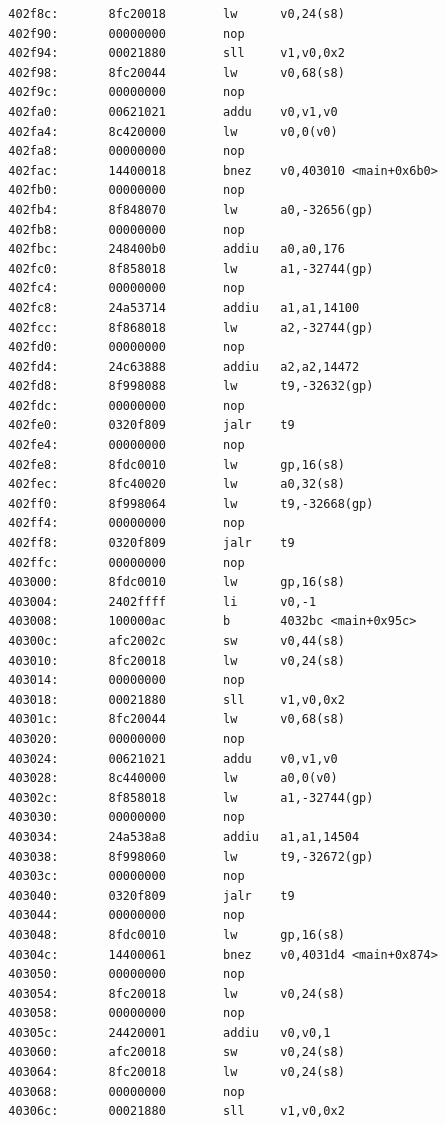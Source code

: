 \documentclass[11pt]{article}
\begin{document}
\begin{verbatim}
  402f8c:       8fc20018        lw      v0,24(s8)
  402f90:       00000000        nop
  402f94:       00021880        sll     v1,v0,0x2
  402f98:       8fc20044        lw      v0,68(s8)
  402f9c:       00000000        nop
  402fa0:       00621021        addu    v0,v1,v0
  402fa4:       8c420000        lw      v0,0(v0)
  402fa8:       00000000        nop
  402fac:       14400018        bnez    v0,403010 <main+0x6b0>
  402fb0:       00000000        nop
  402fb4:       8f848070        lw      a0,-32656(gp)
  402fb8:       00000000        nop
  402fbc:       248400b0        addiu   a0,a0,176
  402fc0:       8f858018        lw      a1,-32744(gp)
  402fc4:       00000000        nop
  402fc8:       24a53714        addiu   a1,a1,14100
  402fcc:       8f868018        lw      a2,-32744(gp)
  402fd0:       00000000        nop
  402fd4:       24c63888        addiu   a2,a2,14472
  402fd8:       8f998088        lw      t9,-32632(gp)
  402fdc:       00000000        nop
  402fe0:       0320f809        jalr    t9
  402fe4:       00000000        nop
  402fe8:       8fdc0010        lw      gp,16(s8)
  402fec:       8fc40020        lw      a0,32(s8)
  402ff0:       8f998064        lw      t9,-32668(gp)
  402ff4:       00000000        nop
  402ff8:       0320f809        jalr    t9
  402ffc:       00000000        nop
  403000:       8fdc0010        lw      gp,16(s8)
  403004:       2402ffff        li      v0,-1
  403008:       100000ac        b       4032bc <main+0x95c>
  40300c:       afc2002c        sw      v0,44(s8)
  403010:       8fc20018        lw      v0,24(s8)
  403014:       00000000        nop
  403018:       00021880        sll     v1,v0,0x2
  40301c:       8fc20044        lw      v0,68(s8)
  403020:       00000000        nop
  403024:       00621021        addu    v0,v1,v0
  403028:       8c440000        lw      a0,0(v0)
  40302c:       8f858018        lw      a1,-32744(gp)
  403030:       00000000        nop
  403034:       24a538a8        addiu   a1,a1,14504
  403038:       8f998060        lw      t9,-32672(gp)
  40303c:       00000000        nop
  403040:       0320f809        jalr    t9
  403044:       00000000        nop
  403048:       8fdc0010        lw      gp,16(s8)
  40304c:       14400061        bnez    v0,4031d4 <main+0x874>
  403050:       00000000        nop
  403054:       8fc20018        lw      v0,24(s8)
  403058:       00000000        nop
  40305c:       24420001        addiu   v0,v0,1
  403060:       afc20018        sw      v0,24(s8)
  403064:       8fc20018        lw      v0,24(s8)
  403068:       00000000        nop
  40306c:       00021880        sll     v1,v0,0x2

\end{verbatim}
\end{document}
